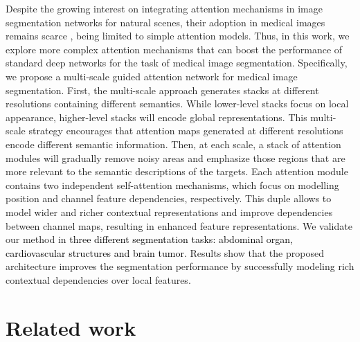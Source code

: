 \documentclass[journal]{IEEEtran}
\begin{document}
Despite the growing interest on integrating attention mechanisms in image segmentation networks for natural scenes, their adoption in medical images remains scarce \cite{wang18d,li2018attention,schlemper2019attention,nie2018asdnet,roy2018concurrent}, being limited to simple attention models. Thus, in this work, we explore more complex attention mechanisms that can boost the performance of standard deep networks for the task of medical image segmentation. Specifically, we propose a multi-scale guided attention network for medical image segmentation. First, the multi-scale approach generates stacks at different resolutions containing different semantics. While lower-level stacks focus on local appearance, higher-level stacks will encode global representations. This multi-scale strategy encourages that attention maps generated at different resolutions encode different semantic information. Then, at each scale, a stack of attention modules will gradually remove noisy areas and emphasize those regions that are more relevant to the semantic descriptions of the targets. Each attention module contains two independent self-attention mechanisms, which focus on modelling position and channel feature dependencies, respectively. This duple allows to model wider and richer contextual representations and improve dependencies between channel maps, resulting in enhanced feature representations. We validate our method in \textcolor{black}{three different segmentation tasks: abdominal organ, cardiovascular structures and brain tumor}. Results show that the proposed architecture improves the segmentation performance by successfully modeling rich contextual dependencies over local features.

\section{Related work}
\end{document}
